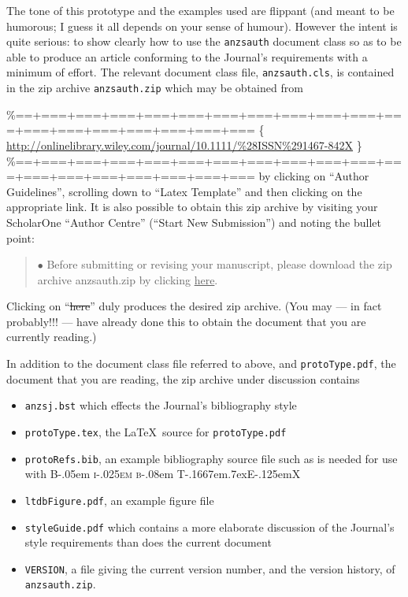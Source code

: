 \documentclass[
  times,
  doublespace]{anzsauth}
\providecommand{\tightlist}{%
  \setlength{\itemsep}{0pt}\setlength{\parskip}{0pt}}\usepackage{longtable,booktabs,array}
\newcommand\BibTeX{{\rmfamily B\kern-.05em \textsc{i\kern-.025em b}\kern-.08em
T\kern-.1667em\lower.7ex\hbox{E}\kern-.125emX}}
\begin{document}
The tone of this prototype and the examples used are flippant (and meant
to be humorous; I guess it all depends on your sense of humour). However
the intent is quite serious: to show clearly how to use the
\texttt{anzsauth} document class so as to be able to produce an article
conforming to the Journal's requirements with a minimum of effort. The
relevant document class file, \texttt{anzsauth.cls}, is contained in the
zip archive \texttt{anzsauth.zip} which may be obtained from

\%==+===+===+===+===+===+===+===+===+===+===+===+===+===+===+===+===+===+===
\{\small
\url{http://onlinelibrary.wiley.com/journal/10.1111/%28ISSN%291467-842X}%
\}
\%==+===+===+===+===+===+===+===+===+===+===+===+===+===+===+===+===+===+===
\noindent by clicking on ``Author Guidelines'', scrolling down to
``Latex Template'' and then clicking on the appropriate link. It is also
possible to obtain this zip archive by visiting your ScholarOne ``Author
Centre'' (``Start New Submission'') and noting the bullet point:

\begin{quote}
\(\bullet\) Before submitting or revising your manuscript, please
download the zip archive anzsauth.zip by clicking \underline{here}.
\end{quote}

Clicking on ``\st{here}'' duly produces the desired zip archive. (You
may --- in fact probably!!! --- have already done this to obtain the
document that you are currently reading.)

In addition to the document class file referred to above, and
\texttt{protoType.pdf}, the document that you are reading, the zip
archive under discussion contains

\begin{itemize}
\tightlist
\item
  \texttt{anzsj.bst} which effects the Journal's bibliography style
\item
  \texttt{protoType.tex}, the \LaTeX~source for \texttt{protoType.pdf}
\item
  \texttt{protoRefs.bib}, an example bibliography source file such as is
  needed for use with \BibTeX
\item
  \texttt{ltdbFigure.pdf}, an example figure file
\item
  \texttt{styleGuide.pdf} which contains a more elaborate discussion of
  the Journal's style requirements than does the current document
\item
  \texttt{VERSION}, a file giving the current version number, and the
  version history, of \texttt{anzsauth.zip}.
\end{itemize}
\end{document}
